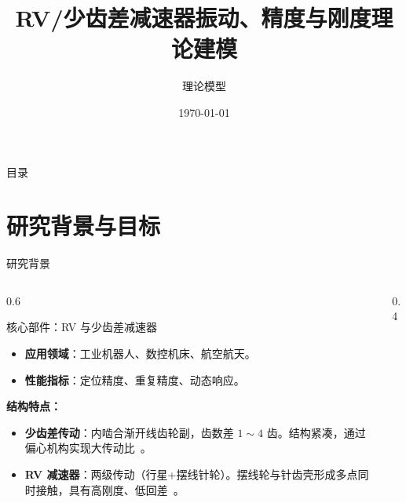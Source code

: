 \documentclass[aspectratio=169,10pt,xcolor=table]{ctexbeamer}
\title{\bfseries RV/少齿差减速器振动、精度与刚度理论建模}
\author{理论模型}
\date{\today}
\begin{document}
\begin{frame}
  \titlepage
\end{frame}

\begin{frame}{目录}
  \tableofcontents
\end{frame}

\section{研究背景与目标}

\begin{frame}{研究背景}
  \begin{columns}
    \begin{column}{0.6\textwidth}
      \begin{block}{核心部件：RV 与少齿差减速器}
      \begin{itemize}
        \item \textbf{应用领域}：工业机器人、数控机床、航空航天。
        \item \textbf{性能指标}：定位精度、重复精度、动态响应。
      \end{itemize}
      \end{block}
      
      \vspace{1em}
      \textbf{结构特点：}
      \begin{itemize}
        \item \textbf{少齿差传动}：内啮合渐开线齿轮副，齿数差 $1\sim4$ 齿。结构紧凑，通过偏心机构实现大传动比~\cite{litvin}。
        \item \textbf{RV 减速器}：两级传动（行星+摆线针轮）。摆线轮与针齿壳形成多点同时接触，具有高刚度、低回差~\cite{rvdynamic}。
      \end{itemize}
    \end{column}
    \begin{column}{0.4\textwidth}
      \centering
    \end{column}
  \end{columns}
\end{frame}
\end{document}
